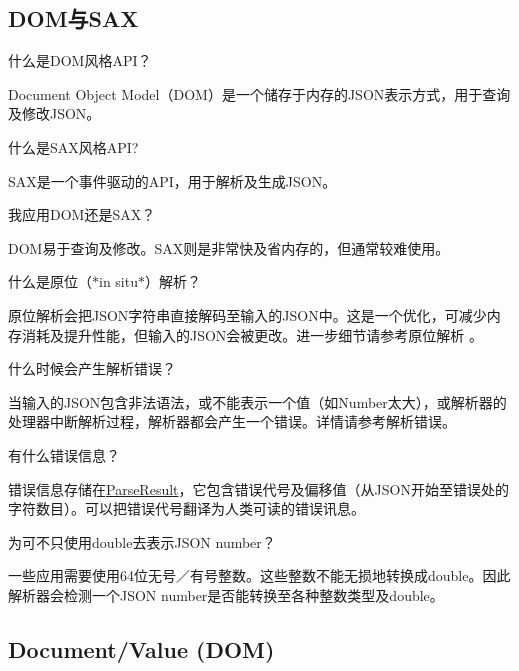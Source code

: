 \subsection*{D\+O\+M与\+S\+AX}


\begin{DoxyEnumerate}
\item 什么是\+D\+O\+M风格\+A\+P\+I？

Document Object Model（\+D\+O\+M）是一个储存于内存的\+J\+S\+O\+N表示方式，用于查询及修改\+J\+S\+O\+N。
\item 什么是\+S\+A\+X风格\+A\+PI?

S\+A\+X是一个事件驱动的\+A\+P\+I，用于解析及生成\+J\+S\+O\+N。
\item 我应用\+D\+O\+M还是\+S\+A\+X？

D\+O\+M易于查询及修改。\+S\+A\+X则是非常快及省内存的，但通常较难使用。
\item 什么是原位（$\ast$in situ$\ast$）解析？

原位解析会把\+J\+S\+O\+N字符串直接解码至输入的\+J\+S\+O\+N中。这是一个优化，可减少内存消耗及提升性能，但输入的\+J\+S\+O\+N会被更改。进一步细节请参考原位解析 。
\item 什么时候会产生解析错误？

当输入的\+J\+S\+O\+N包含非法语法，或不能表示一个值（如\+Number太大），或解析器的处理器中断解析过程，解析器都会产生一个错误。详情请参考解析错误。
\item 有什么错误信息？

错误信息存储在{\ttfamily \hyperlink{struct_parse_result}{Parse\+Result}}，它包含错误代号及偏移值（从\+J\+S\+O\+N开始至错误处的字符数目）。可以把错误代号翻译为人类可读的错误讯息。
\item 为可不只使用{\ttfamily double}去表示\+J\+S\+ON number？

一些应用需要使用64位无号／有号整数。这些整数不能无损地转换成{\ttfamily double}。因此解析器会检测一个\+J\+S\+ON number是否能转换至各种整数类型及{\ttfamily double}。
\end{DoxyEnumerate}

\subsection*{Document/\+Value (D\+OM)}


